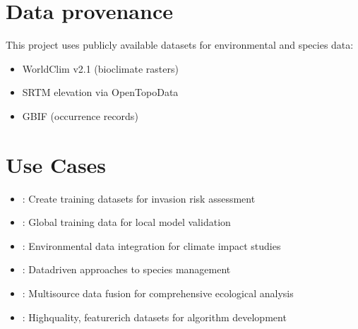 \documentclass[letterpaper,10pt,english]{sphinxmanual}
\begin{document}
\section{Data provenance}
\label{\detokenize{overview:data-provenance}}
\sphinxAtStartPar
This project uses publicly available datasets for environmental and species data:
\begin{itemize}
\item {} 
\sphinxAtStartPar
WorldClim v2.1 (bioclimate rasters)

\item {} 
\sphinxAtStartPar
SRTM elevation via Open\sphinxhyphen{}Topo\sphinxhyphen{}Data

\item {} 
\sphinxAtStartPar
GBIF (occurrence records)

\end{itemize}


\section{Use Cases}
\label{\detokenize{overview:use-cases}}\begin{itemize}
\item {} 
\sphinxAtStartPar
{}: Create training datasets for invasion risk assessment

\item {} 
\sphinxAtStartPar
{}: Global training data for local model validation

\item {} 
\sphinxAtStartPar
{}: Environmental data integration for climate impact studies

\item {} 
\sphinxAtStartPar
{}: Data\sphinxhyphen{}driven approaches to species management

\item {} 
\sphinxAtStartPar
{}: Multi\sphinxhyphen{}source data fusion for comprehensive ecological analysis

\item {} 
\sphinxAtStartPar
{}: High\sphinxhyphen{}quality, feature\sphinxhyphen{}rich datasets for algorithm development

\end{itemize}
\end{document}
